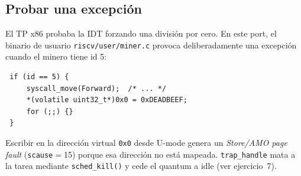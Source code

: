 \subsection{Probar una excepción}

El TP x86 probaba la IDT forzando una división por cero. En este port, el binario de usuario \texttt{riscv/user/miner.c}
provoca deliberadamente una excepción cuando el minero tiene id 5:

\begin{codesnippet}
\begin{verbatim}
 if (id == 5) {
     syscall_move(Forward);  /* ... */
     *(volatile uint32_t*)0x0 = 0xDEADBEEF;
     for (;;) {}
 }
\end{verbatim}
\end{codesnippet}

Escribir en la dirección virtual \texttt{0x0} desde U-mode genera un \emph{Store/AMO page fault} (\texttt{scause}$=$15)
porque esa dirección no está mapeada. \texttt{trap\_handle} mata a la tarea mediante \texttt{sched\_kill()} y cede el
quantum a idle (ver ejercicio~7).
